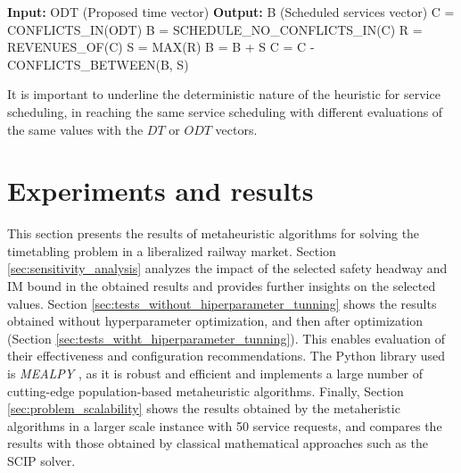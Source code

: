 \documentclass[Afour,sagev,times]{sagej}
\begin{document}
\begin{algorithm}
\caption{Heuristic for obtaining the services to be scheduled}
\label{alg:heuristico_planificacion}
\begin{algorithmic}[1]
\STATE \textbf{Input:} ODT (Proposed time vector)
\STATE \textbf{Output:} B (Scheduled services vector)
\STATE C = CONFLICTS\_IN(ODT) %
\STATE B = SCHEDULE\_NO\_CONFLICTS\_IN(C) %
\STATE R = REVENUES\_OF(C) %
\STATE S = MAX(R) %
\STATE B = B + S %
\STATE C = C - CONFLICTS\_BETWEEN(B, S) %
\ENDWHILE
\end{algorithmic}
\end{algorithm}

It is important to underline the deterministic nature of the heuristic for service scheduling, in reaching the same service scheduling with different evaluations of the same values with the $ DT $ or $ ODT $ vectors.

\section{Experiments and results}
\label{sec:results}

This section presents the results of metaheuristic algorithms for solving the timetabling problem in a liberalized railway market. Section \ref{sec:sensitivity_analysis} analyzes the impact of the selected safety headway and \gls{IM} bound in the obtained results and provides further insights on the selected values. Section \ref{sec:tests_without_hiperparameter_tunning} shows the results obtained without hyperparameter optimization, and then after optimization (Section \ref{sec:tests_witht_hiperparameter_tunning}). This enables evaluation of their effectiveness and configuration recommendations. The Python library used is \textit{MEALPY} \cite{Vanthieu2023}, as it is  robust and efficient and implements a large number of cutting-edge population-based metaheuristic algorithms. Finally, Section \ref{sec:problem_scalability} shows the results obtained by the metaheristic algorithms in a larger scale instance with 50 service requests, and compares the results with those obtained by classical mathematical approaches such as the \gls{SCIP} solver.
\end{document}
